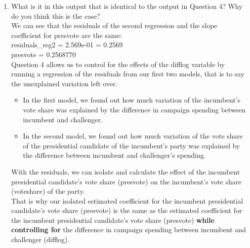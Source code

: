 \documentclass[12pt,letterpaper]{article}
\begin{document}
\begin{enumerate}
		
		\item What is it in this output that is identical to the output in Question 4? Why do you think this is the case?\\
		
		We can see that the residuals of the second regression and the slope coefficient for presvote are the same:\\
		residuals\_reg2 = 2.569e-01 = 0.2569\\
		presvote = 0.2568770
		\vspace{.5cm} \\
		Question 4 allows us to control for the effects of the difflog variable by running a regression of the residuals from our first two models, that is to say the unexplained variation left over.
		\begin{itemize}
			\item In the first model, we found out how much variation of the incumbent’s vote share was explained by the difference in campaign spending between incumbent and challenger.
			\item In the second model, we found out how much variation of the vote share of the presidential candidate of the incumbent's party was explained by the difference between incumbent and challenger's spending.
		\end{itemize}
		With the residuals, we can isolate and calculate the effect of the incumbent presidential candidate's vote share (presvote) on the incumbent’s vote share (voteshare) of the party. \\
		That is why our isolated estimated coefficient for the incumbent presidential candidate's vote share (presvote) is the same as the estimated coefficient for the incumbent presidential candidate's vote share (presvote) \textbf{while controlling for} the difference in campaign spending between incumbent and challenger (difflog).
		
		
	\end{enumerate}
\end{document}
